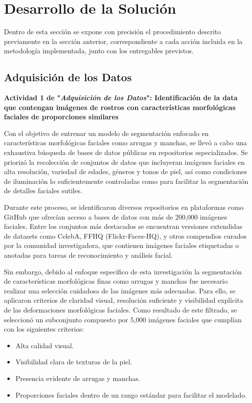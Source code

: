 \chapter{Desarrollo de la Solución}
Dentro de esta sección se expone con precisión el procedimiento descrito previamente en la sección anterior, correspondiente a cada acción incluida en la metodología implementada, junto con los entregables previstos.

\section{Adquisición de los Datos}

\textbf{Actividad 1 de "\textit{Adquisición de los Datos}": Identificación de la data que contengan imágenes de rostros con características morfológicas faciales de proporciones similares}
 
Con el objetivo de entrenar un modelo de segmentación enfocado en características morfológicas faciales como arrugas y manchas, se llevó a cabo una exhaustiva búsqueda de bases de datos públicas en repositorios especializados. Se priorizó la recolección de conjuntos de datos que incluyeran imágenes faciales en alta resolución, variedad de edades, géneros y tonos de piel, así como condiciones de iluminación lo suficientemente controladas como para facilitar la segmentación de detalles faciales sutiles.

Durante este proceso, se identificaron diversos repositorios en plataformas como GitHub que ofrecían acceso a bases de datos con más de 200,000 imágenes faciales. Entre los conjuntos más destacados se encuentran versiones extendidas de datasets como CelebA, FFHQ (Flickr-Faces-HQ), y otros compendios curados por la comunidad investigadora, que contienen imágenes faciales etiquetadas o anotadas para tareas de reconocimiento y análisis facial.

Sin embargo, debido al enfoque específico de esta investigación la segmentación de características morfológicas finas como arrugas y manchas fue necesario realizar una selección cuidadosa de las imágenes más adecuadas. Para ello, se aplicaron criterios de claridad visual, resolución suficiente y visibilidad explícita de las deformaciones morfológicas faciales. Como resultado de este filtrado, se seleccionó un subconjunto compuesto por 5,000 imágenes faciales que cumplían con los siguientes criterios:

\begin{itemize}
    \item Alta calidad visual.   
    \item Visibilidad clara de texturas de la piel.
    \item Presencia evidente de arrugas y manchas.
    \item Proporciones faciales dentro de un rango estándar para facilitar el modelado.
\end{itemize} 

